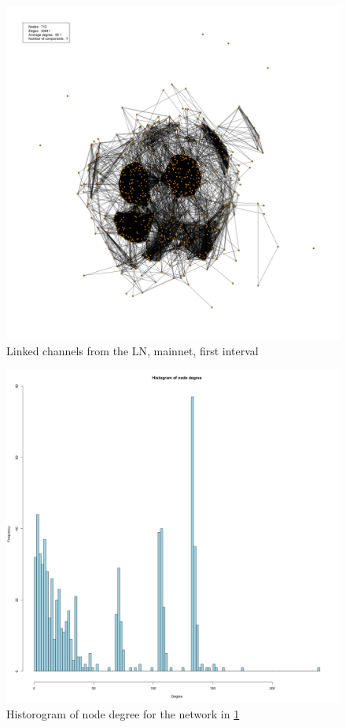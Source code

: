 \begin{figure}[ht]
    \centering
    \includegraphics[width=13cm]{figures/graphs/cg_ln_mainnet_run1.png}
    \caption{Linked channels from the LN, mainnet, first interval}
    \label{fig:channel_network_LN_mainent}
\end{figure}

\begin{figure}[ht]
    \centering
    \includegraphics[width=13cm]{figures/graphs/histogram.png}
    \caption{Historogram of node degree for the network in \cref{fig:channel_network_LN_mainent}}
    \label{fig:histogram}
\end{figure}

